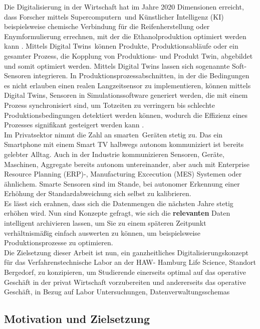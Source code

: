 \documentclass[
fontsize=12pt, 
paper=a4, 
BCOR=10mm, 
twoside=false,
 DIV=10, 
 headsepline, 
 footsepline
 ]{scrartcl}
\begin{document}
Die Digitalisierung in der Wirtschaft hat im Jahre 2020 Dimensionen erreicht, dass Forscher mittels \glqq Supercomputern\grqq \, und Künstlicher Intelligenz (KI) beispielsweise chemische Verbindung für die Reifenherstellung oder Enymformulierung errechnen, mit der die Ethanolproduktion optimiert werden kann \cite{lab40}. Mittels \glqq Digital Twins\grqq \, können Produkte, Produktionsabläufe oder ein gesamter Prozess, die Kopplung von Produktions- und Produkt Twin, abgebildet und somit optimiert werden. Mittels Digital Twins lassen sich sogenannte Soft-Sensoren integrieren. In Produktionsprozessabschnitten, in der die Bedingungen es nicht erlauben einen realen Langzeitsensor zu implementieren, können mittels Digital Twins, Sensoren in Simulationssoftware generiert werden, die mit einem Prozess synchronisiert sind, um Totzeiten zu verringern bis schlechte Produktionsbedingungen detektiert werden können, wodurch die Effizienz eines Prozesses signifikant gesteigert werden kann \cite{digitwin_prozessmodellierung}. \\

Im Privatsektor nimmt die Zahl an \glqq smarten\grqq \, Geräten stetig zu. Das ein Smartphone mit einem Smart TV halbwegs autonom kommuniziert ist bereits gelebter Alltag. Auch in der Industrie kommunizieren Sensoren, Geräte, Maschinen, Aggregate bereits autonom untereinander, aber auch mit Enterprise Resource Planning (ERP)-, Manufacturing Excecution (MES) Systemen oder ähnlichem. Smarte Sensoren sind im Stande, bei autonomer Erkennung einer Erhöhung der Standardabweichung sich selbst zu kalibrieren.\\

Es lässt sich erahnen, dass sich die Datenmengen die nächsten Jahre stetig erhöhen wird. Nun sind Konzepte gefragt, wie sich die \textbf{\glqq relevanten\grqq{}} Daten intelligent archivieren lassen, um Sie zu einem späteren Zeitpunkt verhältnismäßig einfach auswerten zu können, um beispielsweise Produktionsprozesse zu optimieren. \\

Die Zielsetzung dieser Arbeit ist nun, ein ganzheitliches Digitalisierungskonzept für das  Verfahrenstechnische Labor an der HAW- Hamburg Life Science, Standort Bergedorf, zu konzipieren, um Studierende einerseits optimal auf das operative Geschäft in der privat Wirtschaft vorzubereiten und andererseits das operative Geschäft, in Bezug auf Labor Untersuchungen, Datenverwaltungsschemas

\subsection{Motivation und Zielsetzung}
\end{document}
